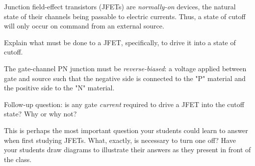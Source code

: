 

Junction field-effect transistors (JFETs) are {\it normally-on} devices, the natural state of their channels being passable to electric currents.  Thus, a state of cutoff will only occur on command from an external source.

Explain what must be done to a JFET, specifically, to drive it into a state of cutoff.







The gate-channel PN junction must be {\it reverse-biased}: a voltage applied between gate and source such that the negative side is connected to the "P" material and the positive side to the "N" material.

\vskip 10pt

Follow-up question: is any gate {\it current} required to drive a JFET into the cutoff state?  Why or why not?







This is perhaps the most important question your students could learn to answer when first studying JFETs.  What, exactly, is necessary to turn one off?  Have your students draw diagrams to illustrate their answers as they present in front of the class.




